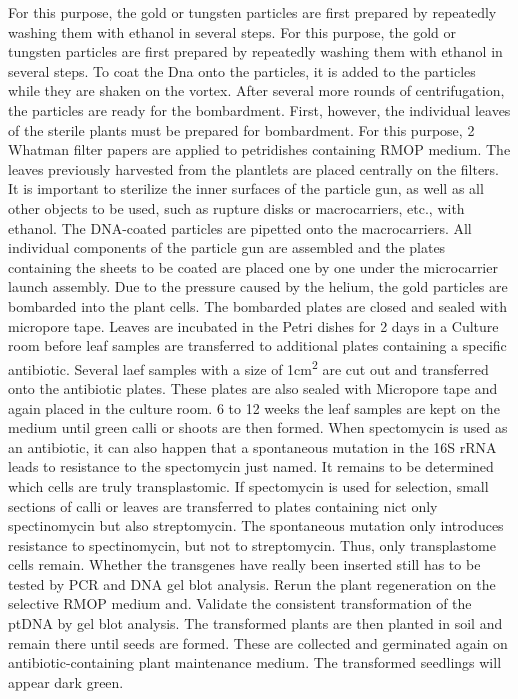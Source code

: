 For this purpose, the gold or tungsten particles are first prepared by repeatedly washing them with ethanol in several steps. For this purpose, the gold or tungsten particles are first prepared by repeatedly washing them with ethanol in several steps. To coat the Dna onto the particles, it is added to the particles while they are shaken on the vortex. After several more rounds of centrifugation, the particles are ready for the bombardment. First, however, the individual leaves of the sterile plants must be prepared for bombardment. For this purpose, 2 Whatman filter papers are applied to petridishes containing RMOP medium. The leaves previously harvested from the plantlets are placed centrally on the filters. It is important to sterilize the inner surfaces of the particle gun, as well as all other objects to be used, such as rupture disks or macrocarriers, etc., with ethanol. The DNA-coated particles are pipetted onto the macrocarriers. All individual components of the particle gun are assembled and the plates containing the sheets to be coated are placed one by one under the microcarrier launch assembly. Due to the pressure caused by the helium, the gold particles are bombarded into the plant cells. The bombarded plates are closed and sealed with micropore tape. Leaves are incubated in the Petri dishes for 2 days in a Culture room before leaf samples are transferred to additional plates containing a specific antibiotic. Several laef samples with a size of 1cm\textsuperscript{2} are cut out and transferred onto the antibiotic plates. These plates are also sealed with Micropore tape and again placed in the culture room. 6 to 12 weeks the leaf samples are kept on the medium until green calli or shoots are then formed. When spectomycin is used as an antibiotic, it can also happen that a spontaneous mutation in the 16S rRNA leads to resistance to the spectomycin just named. It remains to be determined which cells are truly transplastomic. If spectomycin is used for selection, small sections of calli or leaves are transferred to plates containing nict only spectinomycin but also streptomycin. The spontaneous mutation only introduces resistance to spectinomycin, but not to streptomycin. Thus, only transplastome cells remain. Whether the transgenes have really been inserted still has to be tested by PCR and DNA gel blot analysis. Rerun the plant regeneration on the selective RMOP medium and.
Validate the consistent transformation of the ptDNA by gel blot analysis. The transformed plants are then planted in soil and remain there until seeds are formed. These are collected and germinated again on antibiotic-containing plant maintenance medium. The transformed seedlings will appear dark green. 




